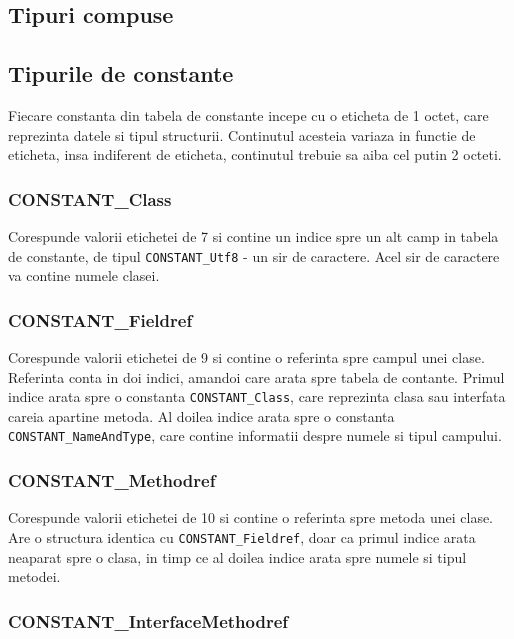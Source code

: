 \subsection{Tipuri compuse}

\subsection{Tipurile de constante}

Fiecare constanta din tabela de constante incepe cu o eticheta de 1
octet, care reprezinta datele si tipul structurii. Continutul acesteia
variaza in functie de eticheta, insa indiferent de eticheta, continutul
trebuie sa aiba cel putin 2 octeti.

\subsubsection{CONSTANT\_Class}

Corespunde valorii etichetei de 7 si contine un indice spre un alt camp
in tabela de constante, de tipul \texttt{CONSTANT\_Utf8} - un sir de
caractere. Acel sir de caractere va contine numele clasei.

\subsubsection{CONSTANT\_Fieldref}

Corespunde valorii etichetei de 9 si contine o referinta spre campul
unei clase. Referinta conta in doi indici, amandoi care arata spre
tabela de contante. Primul indice arata spre o constanta
\texttt{CONSTANT\_Class}, care reprezinta clasa sau interfata careia
apartine metoda. Al doilea indice arata spre o constanta
\texttt{CONSTANT\_NameAndType}, care contine informatii despre numele si
tipul campului.

\subsubsection{CONSTANT\_Methodref}

Corespunde valorii etichetei de 10 si contine o referinta spre metoda
unei clase. Are o structura identica cu \texttt{CONSTANT\_Fieldref},
doar ca primul indice arata neaparat spre o clasa, in timp ce al doilea
indice arata spre numele si tipul metodei.

\subsubsection{CONSTANT\_InterfaceMethodref}

